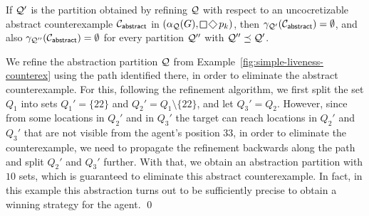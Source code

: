 \begin{theorem}If $\mathcal{Q}'$ is the partition 
obtained by refining $\mathcal{Q}$ with respect to an uncocretizable abstract counterexample $\mathcal{C}_{\mathsf{abstract}}$ in $(\alpha_\part(G),\LTLglobally\LTLfinally p_k)$, then $\gamma_{\mathcal{Q}'}(\mathcal{C}_{\mathsf{abstract}}) = \emptyset$, and also $\gamma_{\mathcal{Q}''}(\mathcal{C}_{\mathsf{abstract}}) = \emptyset$ for every partition $\mathcal{Q}''$ with $\mathcal{Q}'' \preceq \mathcal{Q}'$.
\end{theorem}

\begin{example}\label{ex:simple-liveness-refinement}
We refine the abstraction partition $\mathcal{Q}$ from Example~\ref{fig:simple-liveness-counterex} using the path identified there, in order to eliminate the abstract counterexample. For this, following the refinement algorithm, we first split the set $Q_1$ into sets $Q_1' = \{22\}$ and $Q_2' = Q_1 \setminus \{22\}$, and let $Q_3' = Q_2$. However, since from some locations in $Q_2'$ and in $Q_3'$ the target can reach locations in $Q_2'$ and $Q_3'$ that are not visible from the agent's position $33$, in order to eliminate the counterexample, we need to propagate the refinement backwards along the path and split $Q_2'$ and $Q_3'$ further. With that, we obtain an abstraction partition with $10$ sets, which is guaranteed to eliminate this abstract counterexample. In fact, in this example this abstraction turns out to be sufficiently precise to obtain a winning strategy for the agent.
\qed
\end{example}
